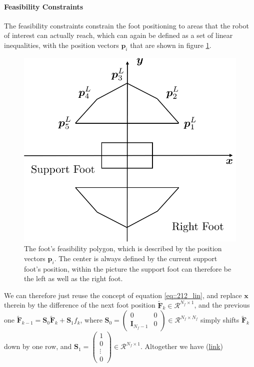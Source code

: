 \paragraph{Feasibility Constraints}
The feasibility constraints constrain the foot positioning to areas that the robot of interest can actually reach, which can again be defined as a set of linear inequalities, with the position vectors $\bm{p}_i$ that are shown in figure \ref{fig::212_foot_feasibility}. 
\begin{figure}[h!]
	\centering
	\includegraphics[scale=.5]{chapters/02_background/img/foot_constraints.png}
	\caption{The foot's feasibility polygon, which is described by the position vectors $\bm{p}_i$. The center is always defined by the current support foot's position, within the picture the support foot can therefore be the left as well as the right foot.}
	\label{fig::212_foot_feasibility}
\end{figure}
We can therefore just reuse the concept of equation \ref{eq::212_lin}, and replace $\bm{x}$ therein by the difference of the next foot position $\tilde{\bm{F}}_{k}\in\mathcal{R}^{N_f\times1}$, and the previous one $\tilde{\bm{F}}_{k-1} = \bm{S}_0\tilde{\bm{F}}_{k} + \bm{S}_1f_k$, where $\bm{S}_0 = \begin{pmatrix}0 & 0 \\ \textbf{I}_{N_f-1} & 0
\end{pmatrix}\in\mathcal{R}^{N_f\times N_f}$ simply shifts $\tilde{\bm{F}}_{k}$ down by one row, and $\bm{S}_1 = \begin{pmatrix}
1 \\ 0 \\ \vdots \\ 0
\end{pmatrix}\in\mathcal{R}^{N_f\times1}$. Altogether we have (\href{https://github.com/mhubii/nmpc_pattern_generator/blob/dc1f5a9366cbbbf76f1b02cada642f6ac9a04c89/libs/pattern_generator/src/base_generator.cpp#L1061}{\underline{link}})
